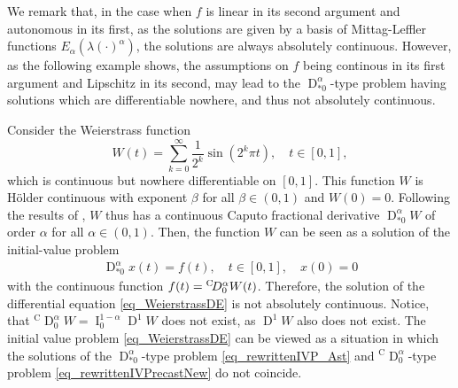 \documentclass{svproc}
\newcommand{\RLintegralInput}[2]{\operatorname{I}_{#2}^{#1}}
\newcommand{\CderivativeInput}[2]{{}^\mathrm{C}\operatorname{D}_{#2}^{#1}}
\newcommand{\AstderivativeInput}[2]{\operatorname{D}_{\ast #2}^{#1}}
\begin{document}
{\begin{proposition}
\end{proposition}
We remark that, in the case when $f$ is linear in its second argument and autonomous in its first, as the solutions are given by a basis of Mittag-Leffler functions $E_\alpha(\lambda (\cdot)^\alpha)$, the solutions are always absolutely continuous. However, as the following example shows, the assumptions on $f$ being continous in its first argument and Lipschitz in its second, may lead to the $\AstderivativeInput{\alpha}{0}$-type problem having solutions which are differentiable nowhere, and thus not absolutely continuous.
\begin{example}
Consider the Weierstrass function \cite{Samko1994}
	\[
	W(t)=\sum_{k=0}^{\infty}\frac{1}{2^k}\sin(2^k\pi t), \quad t\in [0,1],
	\]
	which is continuous but nowhere differentiable on $[0,1]$. This function $W$ is H\"older continuous with exponent $\beta$ for all $\beta \in (0,1)$ and $W(0)=0$. Following the results of \cite{Samko1994}, $W$ thus has a continuous Caputo fractional derivative $\AstderivativeInput{\alpha}{0} W$ of order $\alpha$ for all $\alpha \in (0,1)$. Then, the function $W$ can be seen as a solution of the initial-value problem
	\begin{align}\label{eq_WeierstrassDE}
		\AstderivativeInput{\alpha}{0} x(t)=f(t), \quad t\in [0,1], \quad x(0)=0
	\end{align}
	with the continuous function $f(t)={}^{\rm C}\!D_0^\alpha W(t)$. Therefore, the solution of the differential equation \eqref{eq_WeierstrassDE} is not absolutely continuous. Notice, that $\CderivativeInput{\alpha}{0}W = \RLintegralInput{1-\alpha}{0}\operatorname D^1 W$ does not exist, as $\operatorname{D}^1 W$ also does not exist. The initial value problem \eqref{eq_WeierstrassDE} can be viewed as a situation in which the solutions of the  $\AstderivativeInput{\alpha}{0}$-type problem \eqref{eq_rewrittenIVP_Ast} and $\CderivativeInput{\alpha}{0}$-type problem \eqref{eq_rewrittenIVPrecastNew} do not coincide.
\end{example}
}
\end{document}
